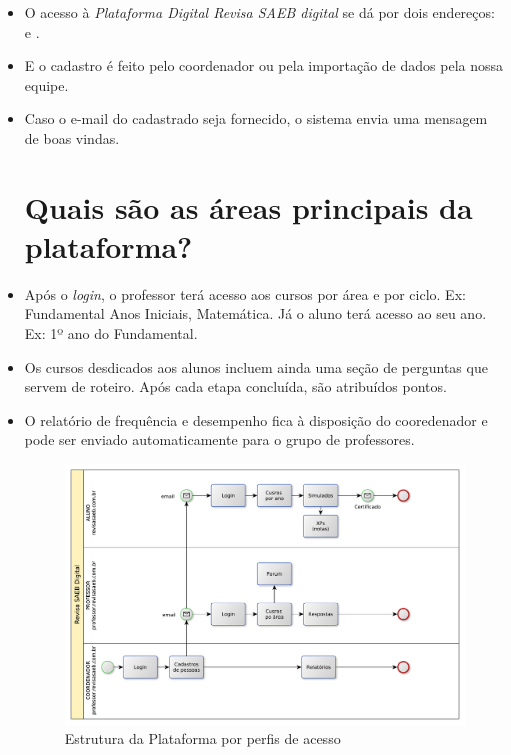 \begin{itemize}
\item O acesso à \textit{Plataforma Digital Revisa SAEB digital} se dá por dois endereços:  e .

\item E o cadastro é feito pelo coordenador ou pela importação de dados pela nossa equipe.

\item Caso o e-mail do cadastrado seja fornecido, o sistema envia uma mensagem de boas vindas. 

\section{Quais são as áreas principais da plataforma?}

\item Após o \textit{login}, o professor terá acesso aos cursos por área e por ciclo. Ex:
Fundamental Anos Iniciais, Matemática. Já o aluno terá acesso ao seu ano. Ex: 1º ano do Fundamental.

\item Os cursos desdicados aos alunos incluem ainda uma seção de perguntas que servem de roteiro.
Após cada etapa concluída, são atribuídos pontos. 

\item O relatório de frequência e desempenho fica à disposição do cooredenador e pode ser 
enviado automaticamente para o grupo de professores. 

\begin{figure}[H]
\includegraphics[width=\textwidth]{imgs/bpmn}
\caption{Estrutura da Plataforma por perfis de acesso}
\end{figure}

\end{itemize}


